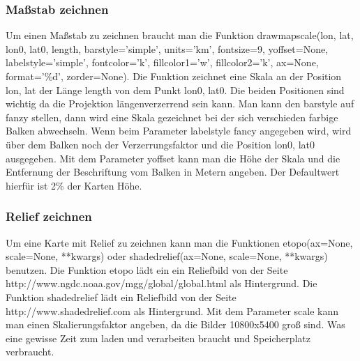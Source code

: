  \subsubsection*{Maßstab zeichnen}
 Um einen Maßstab zu zeichnen braucht man die Funktion \textsf{drawmapscale(lon, lat, lon0, lat0, length, barstyle='simple', units='km', fontsize=9, yoffset=None, labelstyle='simple', fontcolor='k', fillcolor1='w', fillcolor2='k', ax=None, format='\%d', zorder=None)}. Die Funktion zeichnet eine Skala an der Position \textsf{lon, lat} der Länge \textsf{length} von dem Punkt \textsf{lon0, lat0}. Die beiden Positionen sind wichtig da die Projektion längenverzerrend sein kann. Man kann den \textsf{barstyle} auf \textsf{fanzy} stellen, dann wird eine Skala gezeichnet bei der sich verschieden farbige Balken abwechseln. Wenn beim Parameter \textsf{labelstyle fancy} angegeben wird, wird über dem Balken noch der Verzerrungsfaktor und die Position \textsf{lon0, lat0} ausgegeben. Mit dem Parameter \textsf{yoffset} kann man die Höhe der Skala und die Entfernung der Beschriftung vom Balken in Metern angeben. Der Defaultwert hierfür ist 2\% der Karten Höhe.\\
 \subsubsection*{Relief zeichnen}
 Um eine Karte mit Relief zu zeichnen kann man die Funktionen \textsf{etopo(ax=None, scale=None, **kwargs)} oder \textsf{shadedrelief(ax=None, scale=None, **kwargs)} benutzen. Die Funktion \textsf{etopo} lädt ein ein Reliefbild von der Seite \textsf{http://www.ngdc.noaa.gov/mgg/global/global.html} als Hintergrund. Die Funktion \textsf{shadedrelief} lädt ein Reliefbild von der Seite \textsf{http://www.shadedrelief.com} als Hintergrund. Mit dem Parameter \textsf{scale} kann man einen Skalierungsfaktor angeben, da die Bilder 10800x5400 groß sind. Was eine gewisse Zeit zum laden und verarbeiten braucht und Speicherplatz verbraucht.